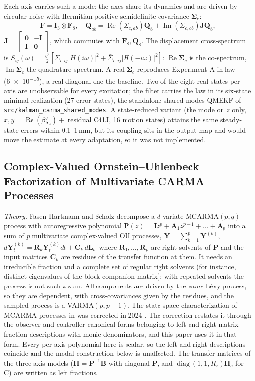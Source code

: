 \documentclass[conference]{IEEEtran}
\DeclareRobustCommand{\vct}[1]{\bm{#1}}
\DeclareRobustCommand{\mat}[1]{\bm{#1}}
\theoremstyle{bodysmall}
\begin{document}
Each axis carries such a mode; the axes share its dynamics and are driven by
circular noise with Hermitian positive semidefinite covariance $\mat\Sigma_c$:
\begin{equation}
\mat F=\mat I_3\otimes\mat F_8,\quad
\mat Q_{ab}=\operatorname{Re}(\Sigma_{c,ab})\mat Q_8
          +\operatorname{Im}(\Sigma_{c,ab})\mat J\mat Q_8,
\label{eq:hkron}
\end{equation}
$\mat J=\left[\begin{smallmatrix}\mat 0&-\mat I\\\mat I&\mat 0\end{smallmatrix}\right]$,
which commutes with $\mat F_8,\mat Q_8$. The displacement cross-spectrum is
$S_{ij}(\omega)=\tfrac{g^2}2[\Sigma_{c,ij}|H(i\omega)|^2+\bar\Sigma_{c,ij}|H(-i\omega)|^2]$:
$\operatorname{Re}\mat\Sigma_c$ is the co-spectrum, $\operatorname{Im}\mat\Sigma_c$
the quadrature spectrum. A real $\mat\Sigma_c$ reproduces Experiment A in law
(\num{6e-15}), a real diagonal one the baseline. Two of the eight real
states per axis are unobservable for every excitation; the filter carries the
law in its six-state minimal realization (27 error states), the standalone
shared-modes QMEKF of \texttt{src/kalman\_carma\_shared\_modes}. A
state-reduced variant (the mode on $z$ only,
$x,y=\operatorname{Re}(\beta\zeta_z)+$ residual C41J, 16 motion states)
attains the same steady-state errors within 0.1--1\,mm, but its coupling sits
in the output map and would move the estimate at every adaptation, so it was
not implemented.

\subsection{Complex-Valued Ornstein--Uhlenbeck Factorization of Multivariate CARMA Processes}
\label{sec:modal}
\emph{Theory.} Fasen-Hartmann and Scholz \cite{fasen21} decompose a
$d$-variate MCARMA$(p,q)$ process with autoregressive polynomial
$\mat P(z)=\mat Iz^p+\mat A_1z^{p-1}+\dots+\mat A_p$ into a sum of $p$
multivariate complex-valued OU processes,
$\vct Y=\sum_{k=1}^p\vct Y^{(k)}$,
$d\vct Y^{(k)}_t=\mat R_k\vct Y^{(k)}_tdt+\mat C_k\,d\vct L_t$, where
$\mat R_1,\dots,\mat R_p$ are right solvents of $\mat P$ and the input
matrices $\mat C_k$ are residues of the transfer function at them. It needs
an irreducible fraction and a complete set of regular right solvents (for
instance, distinct eigenvalues of the block companion matrix); with repeated
solvents the process is not such a sum. All components are driven by the
\emph{same} L\'evy process, so they are dependent, with cross-covariances
given by the residues, and the sampled process is a VARMA$(p,p-1)$. The
state-space characterization of MCARMA processes in \cite{schlemm12} was
corrected in 2024 \cite{stelzer24}. The correction restates it through the
observer and controller canonical forms belonging to left and right
matrix-fraction descriptions with monic denominators, and this paper uses
it in that form. Every per-axis polynomial here is scalar, so the left and
right descriptions coincide and the modal construction below is unaffected.
The transfer matrices of the three-axis models
($\mat H=\mat P^{-1}\mat B$ with diagonal $\mat P$, and
$\operatorname{diag}(1,1,R_z)\mat H_c$ for C) are written as left fractions.
\end{document}
